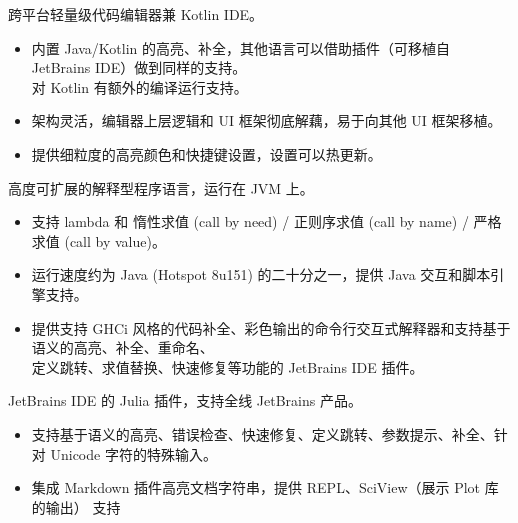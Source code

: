 \documentclass{resume}
\begin{document}
跨平台轻量级代码编辑器兼 Kotlin IDE。
\begin{itemize}
  \item 内置 Java/Kotlin 的高亮、补全，其他语言可以借助插件（可移植自 JetBrains IDE）做到同样的支持。 \\
    对 Kotlin 有额外的编译运行支持。
  \item 架构灵活，编辑器上层逻辑和 UI 框架彻底解藕，易于向其他 UI 框架移植。
  \item 提供细粒度的高亮颜色和快捷键设置，设置可以热更新。
\end{itemize}

高度可扩展的解释型程序语言，运行在 JVM 上。
\begin{itemize}
  \item 支持 lambda 和 惰性求值 (call by need) / 正则序求值 (call by name) / 严格求值 (call by value)。
  \item 运行速度约为 Java (Hotspot 8u151) 的二十分之一，提供 Java 交互和脚本引擎支持。
  \item 提供支持 GHCi 风格的代码补全、彩色输出的命令行交互式解释器和支持基于语义的高亮、补全、重命名、 \\
    定义跳转、求值替换、快速修复等功能的 JetBrains IDE 插件。
\end{itemize}

JetBrains IDE 的 Julia 插件，支持全线 JetBrains 产品。
\begin{itemize}
  \item 支持基于语义的高亮、错误检查、快速修复、定义跳转、参数提示、补全、针对 Unicode 字符的特殊输入。
  \item 集成 Markdown 插件高亮文档字符串，提供 REPL、SciView（展示 Plot 库的输出） 支持
\end{itemize}


\end{document}
